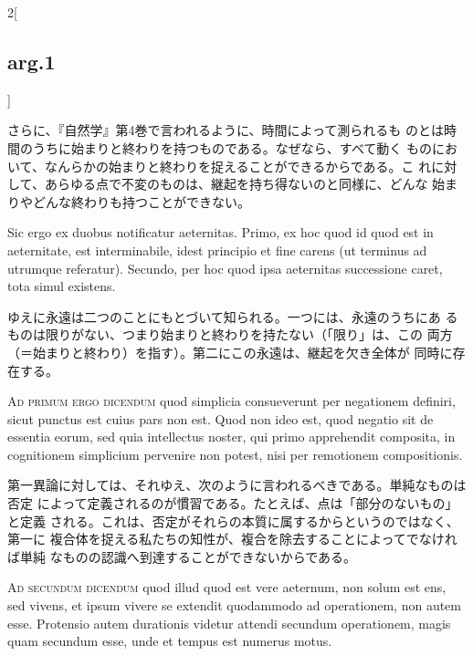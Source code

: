 \documentclass[paper=a4paper,fontsize=10pt,jafontsize=9pt,titlepage]{jlreq}
\begin{document}
\begin{paracol}{2}[\subsection{arg.1}]
\switchcolumn

さらに、『自然学』第4巻で言われるように、時間によって測られるも
のとは時間のうちに始まりと終わりを持つものである。なぜなら、すべて動く
ものにおいて、なんらかの始まりと終わりを捉えることができるからである。こ
れに対して、あらゆる点で不変のものは、継起を持ち得ないのと同様に、どんな
始まりやどんな終わりも持つことができない。

\switchcolumn*

Sic ergo ex duobus notificatur aeternitas. Primo, ex hoc quod
id quod est in aeternitate, est interminabile, idest principio et fine
carens (ut terminus ad utrumque referatur). Secundo, per hoc quod ipsa
aeternitas successione caret, tota simul existens.

\switchcolumn

ゆえに永遠は二つのことにもとづいて知られる。一つには、永遠のうちにあ
るものは限りがない、つまり始まりと終わりを持たない（「限り」は、この
両方（＝始まりと終わり）を指す）。第二にこの永遠は、継起を欠き全体が
同時に存在する。

\switchcolumn*[\subsection{ad.1}]

{\scshape Ad primum ergo dicendum} quod simplicia consueverunt per negationem
definiri, sicut punctus est cuius pars non est. Quod non ideo est, quod
negatio sit de essentia eorum, sed quia intellectus noster, qui primo
apprehendit composita, in cognitionem simplicium pervenire non potest,
nisi per remotionem compositionis.

\switchcolumn

第一異論に対しては、それゆえ、次のように言われるべきである。単純なものは否定
によって定義されるのが慣習である。たとえば、点は「部分のないもの」と定義
される。これは、否定がそれらの本質に属するからというのではなく、第一に
複合体を捉える私たちの知性が、複合を除去することによってでなければ単純
なものの認識へ到達することができないからである。

\switchcolumn*[\subsection{ad.2}]

{\scshape Ad secundum dicendum} quod illud quod est vere aeternum, non solum est
ens, sed vivens, et ipsum vivere se extendit quodammodo ad operationem,
non autem esse. Protensio autem durationis videtur attendi secundum
operationem, magis quam secundum esse, unde et tempus est numerus motus.


\end{paracol}
\end{document}
